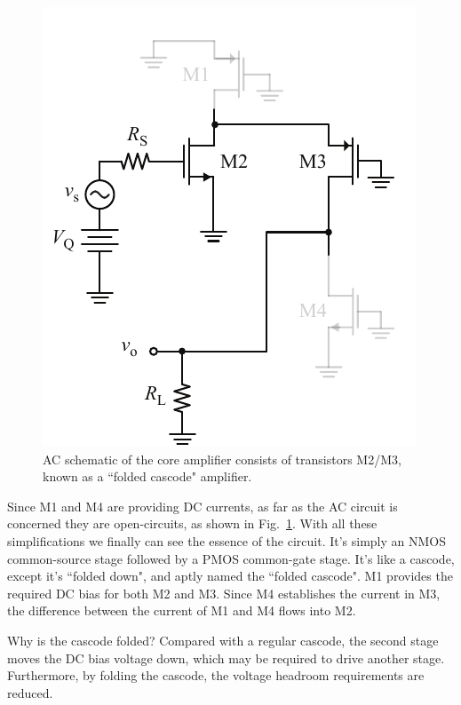 \begin{figure}[tb]
\begin{center}
\includegraphics[scale=1]{19cascode_folded_ac}
\end{center}
\caption{AC schematic of the core amplifier consists of transistors M2/M3, known as a ``folded cascode" amplifier.} \label{fig:19cascode_folded_ac}
\end{figure}

Since M1 and M4 are providing DC currents, as far as the AC circuit is concerned they are open-circuits, as shown in Fig.~\ref{fig:19cascode_folded_ac}.  With all these simplifications we finally can see the essence of the circuit. It's simply an NMOS common-source stage followed by a PMOS common-gate stage.  It's like a cascode, except it's ``folded down", and aptly named the ``folded cascode".  M1 provides the required DC bias for both M2 and M3.  Since M4 establishes the current in M3, the difference between the current of M1 and M4 flows into M2.

Why is the cascode folded?  Compared with a regular cascode, the second stage moves the DC bias voltage down, which may be required to drive another stage.  Furthermore, by folding the cascode, the voltage headroom requirements are reduced.

